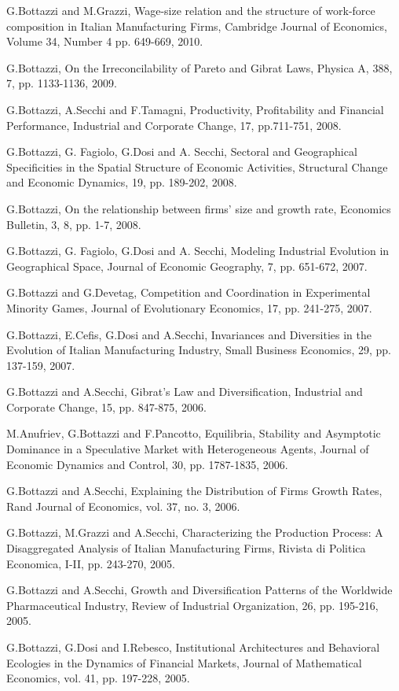 \documentclass[a4paper]{article}
\begin{document}
G.Bottazzi and M.Grazzi, Wage-size relation and the structure of
work-force composition in Italian Manufacturing Firms, Cambridge
Journal of Economics, Volume 34, Number 4 pp. 649-669, 2010.

G.Bottazzi, On the Irreconcilability of Pareto and Gibrat Laws,
Physica A, 388, 7, pp. 1133-1136, 2009.

G.Bottazzi, A.Secchi and F.Tamagni, Productivity, Profitability and
Financial Performance, Industrial and Corporate Change, 17,
pp.711-751, 2008.

G.Bottazzi, G. Fagiolo, G.Dosi and A. Secchi, Sectoral and
Geographical Specificities in the Spatial Structure of Economic
Activities, Structural Change and Economic Dynamics, 19, pp. 189-202,
2008.

G.Bottazzi, On the relationship between firms' size and growth rate,
Economics Bulletin, 3, 8, pp. 1-7, 2008.

G.Bottazzi, G. Fagiolo, G.Dosi and A. Secchi, Modeling Industrial
Evolution in Geographical Space, Journal of Economic Geography, 7,
pp. 651-672, 2007.

G.Bottazzi and G.Devetag, Competition and Coordination in Experimental
Minority Games, Journal of Evolutionary Economics, 17, pp. 241-275,
2007.

G.Bottazzi, E.Cefis, G.Dosi and A.Secchi, Invariances and Diversities
in the Evolution of Italian Manufacturing Industry, Small Business
Economics, 29, pp. 137-159, 2007.

G.Bottazzi and A.Secchi, Gibrat's Law and Diversification, Industrial
and Corporate Change, 15, pp. 847-875, 2006.

M.Anufriev, G.Bottazzi and F.Pancotto, Equilibria, Stability and
Asymptotic Dominance in a Speculative Market with Heterogeneous
Agents, Journal of Economic Dynamics and Control, 30, pp. 1787-1835,
2006.

G.Bottazzi and A.Secchi, Explaining the Distribution of Firms Growth
Rates, Rand Journal of Economics, vol. 37, no. 3, 2006.

G.Bottazzi, M.Grazzi and A.Secchi, Characterizing the Production
Process: A Disaggregated Analysis of Italian Manufacturing Firms,
Rivista di Politica Economica, I-II, pp. 243-270, 2005.

G.Bottazzi and A.Secchi, Growth and Diversification Patterns of the
Worldwide Pharmaceutical Industry, Review of Industrial Organization,
26, pp. 195-216, 2005.

G.Bottazzi, G.Dosi and I.Rebesco, Institutional Architectures and
Behavioral Ecologies in the Dynamics of Financial Markets, Journal of
Mathematical Economics, vol. 41, pp.  197-228, 2005.
\end{document}
